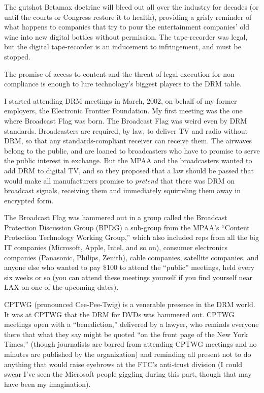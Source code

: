 The gutshot Betamax doctrine will bleed out all over the industry
for decades (or until the courts or Congress restore it to health),
providing a grisly reminder of what happens to companies that try
to pour the entertainment companies' old wine into new digital
bottles without permission. The tape-recorder was legal, but the
digital tape-recorder is an inducement to infringement, and must be
stopped.

The promise of access to content and the threat of legal execution
for non-compliance is enough to lure technology's biggest players
to the DRM table.

I started attending DRM meetings in March, 2002, on behalf of my
former employers, the Electronic Frontier Foundation. My first
meeting was the one where Broadcast Flag was born. The Broadcast
Flag was weird even by DRM standards. Broadcasters are required, by
law, to deliver TV and radio without DRM, so that any
standards-compliant receiver can receive them. The airwaves belong
to the public, and are loaned to broadcasters who have to promise
to serve the public interest in exchange. But the MPAA and the
broadcasters wanted to add DRM to digital TV, and so they proposed
that a law should be passed that would make all manufacturers
promise to \emph{pretend} that there was DRM on broadcast
signals, receiving them and immediately squirreling them away in
encrypted form.

The Broadcast Flag was hammered out in a group called the Broadcast
Protection Discussion Group (BPDG) a sub-group from the MPAA's
``Content Protection Technology Working Group,'' which also included
reps from all the big IT companies (Microsoft, Apple, Intel, and so
on), consumer electronics companies (Panasonic, Philips, Zenith),
cable companies, satellite companies, and anyone else who wanted to
pay \$100 to attend the ``public'' meetings, held every six weeks or
so (you can attend these meetings yourself if you find yourself
near LAX on one of the upcoming dates).

CPTWG (pronounced Cee-Pee-Twig) is a venerable presence in the DRM
world. It was at CPTWG that the DRM for DVDs was hammered out.
CPTWG meetings open with a ``benediction,'' delivered by a lawyer,
who reminds everyone there that what they say might be quoted ``on
the front page of the New York Times,'' (though journalists are
barred from attending CPTWG meetings and no minutes are published
by the organization) and reminding all present not to do anything
that would raise eyebrows at the FTC's anti-trust division (I could
swear I've seen the Microsoft people giggling during this part,
though that may have been my imagination).


